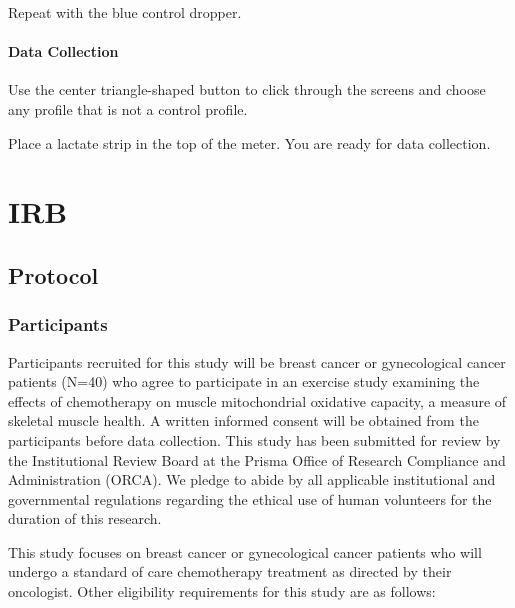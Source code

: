 \documentclass[
]{book}
\begin{document}
Repeat with the blue control dropper.

\hypertarget{Appendix-Instruments-LactateMeter-Usage-DataCollection}{%
\subsubsection{Data Collection}\label{Appendix-Instruments-LactateMeter-Usage-DataCollection}}

Use the center triangle-shaped button to click through the screens and choose any profile that is not a control profile.

Place a lactate strip in the top of the meter. You are ready for data collection.

\hypertarget{Appendix-IRB}{%
\chapter{IRB}\label{Appendix-IRB}}

\hypertarget{Appendix-IRB-Protocol}{%
\section{Protocol}\label{Appendix-IRB-Protocol}}

\hypertarget{Appendix-IRB-Protocol-Participants}{%
\subsection{Participants}\label{Appendix-IRB-Protocol-Participants}}

Participants recruited for this study will be breast cancer or gynecological cancer patients (N=40) who agree to participate in an exercise study examining the effects of chemotherapy on muscle mitochondrial oxidative capacity, a measure of skeletal muscle health. A written informed consent will be obtained from the participants before data collection. This study has been submitted for review by the Institutional Review Board at the Prisma Office of Research Compliance and Administration (ORCA). We pledge to abide by all applicable institutional and governmental regulations regarding the ethical use of human volunteers for the duration of this research.

This study focuses on breast cancer or gynecological cancer patients who will undergo a standard of care chemotherapy treatment as directed by their oncologist.
Other eligibility requirements for this study are as follows:
\end{document}
